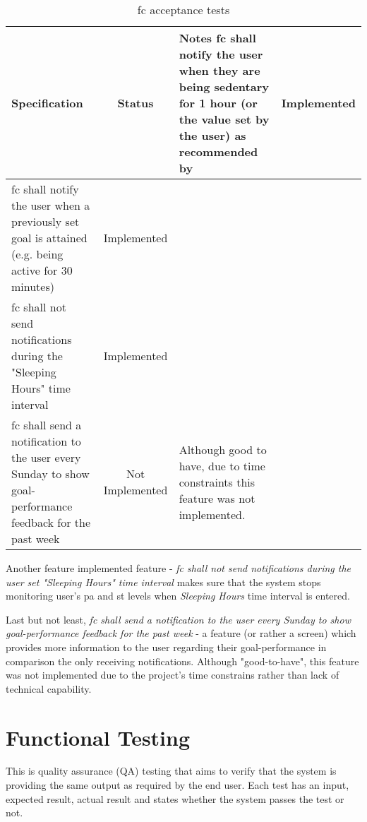 \begin{table}[ht]
    \centering
    \tabulinesep=1.5mm
  \begin{longtabu} to \textwidth {|X|c|X|}
    \hline
      \textbf{Specification}
      & \textbf{Status}
      & \textbf{Notes}
    \endhead \hline
    \gls{fc} shall notify the user when they are being sedentary for 1 hour (or the value set by the user) as recommended by \citet[]{swartz2011}
    & Implemented
    & 
    \\ \hline
    \gls{fc} shall notify the user when a previously set goal is attained (e.g. being active for 30 minutes)
    & Implemented
    & 
    \\ \hline
    \gls{fc} shall not send notifications during the "Sleeping Hours" time interval
    & Implemented
    & 
    \\ \hline
    \gls{fc} shall send a notification to the user every Sunday to show goal-performance feedback for the past week
    & Not Implemented
    & Although good to have, due to time constraints this feature was not implemented.
    \\ \hline
 \end{longtabu}
    \caption{\gls{fc} acceptance tests}
    \label{tab:fc-acceptance-tests}
\end{table}

Another feature implemented feature - \textit{\gls{fc} shall not send notifications during the user set "Sleeping Hours" time interval} makes sure that the system stops monitoring user's \gls{pa} and \gls{st} levels when \textit{Sleeping Hours} time interval is entered. 

Last but not least, \textit{\gls{fc} shall send a notification to the user every Sunday to show goal-performance feedback for the past week} - a feature (or rather a screen) which provides more information to the user regarding their goal-performance in comparison the only receiving notifications. Although "good-to-have", this feature was not implemented due to the project's time constrains rather than lack of technical capability.

\section{Functional Testing}
This is quality assurance (QA) testing that aims to verify that the system is providing the same output as required by the end user. Each test has an input, expected result, actual result and states whether the system passes the test or not.

